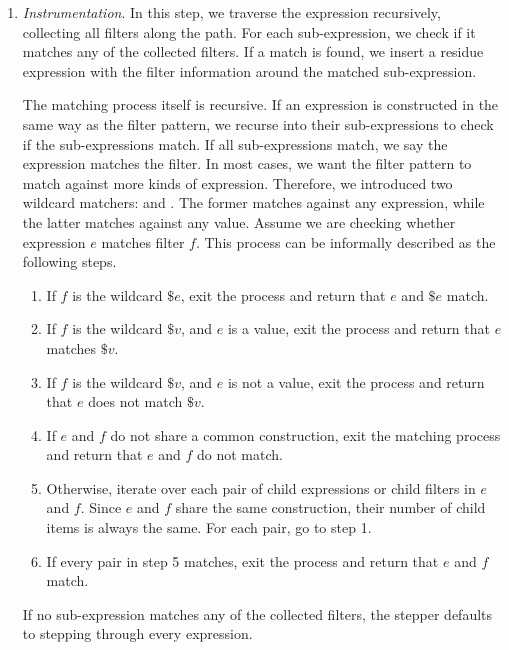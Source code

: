 \begin{enumerate}
\item \emph{Instrumentation}. \label{num:simple_example_instrument} In this
  step, we traverse the expression recursively, collecting all filters along the
  path. For each sub-expression, we check if it matches any of the collected
  filters. If a match is found, we insert a residue expression with the filter
  information around the matched sub-expression.

  The matching process itself is recursive. If an
  expression is constructed in the same way as the filter pattern, we recurse into
  their sub-expressions to check if the sub-expressions match. If all
  sub-expressions match, we say the expression matches the filter. In
  most cases, we want the filter pattern to match
  against more kinds of expression. Therefore, we introduced two
  wildcard matchers:  and
  . The former matches against any
  expression, while the latter matches against any value. Assume
  we are checking whether expression \(e\) matches filter
  \(f\). This process can be informally described as the following
  steps.

  \begin{enumerate}
  \item If \(f\) is the wildcard \(\$e\), exit the process and return
    that \(e\) and \(\$e\) match.
  \item If \(f\) is the wildcard \(\$v\), and \(e\) is a value, exit the process and return
    that \(e\) matches \(\$v\).
  \item If \(f\) is the wildcard \(\$v\), and \(e\) is not a value, exit
    the process and return that \(e\) does not match \(\$v\).
  \item If \(e\) and \(f\) do not share a common construction,
    exit the matching process and return that \(e\) and \(f\) do not
    match.
  \item Otherwise, iterate over each pair of child expressions or
    child filters in \(e\) and \(f\). Since \(e\) and \(f\) share the
    same construction, their number of child items is always the
    same. For each pair, go to step 1.
  \item If every pair in step 5 matches, exit the process and return that \(e\) and \(f\) match.
  \end{enumerate}

  If no sub-expression matches any of the collected filters, the
  stepper defaults to stepping through every expression.


\end{enumerate}
